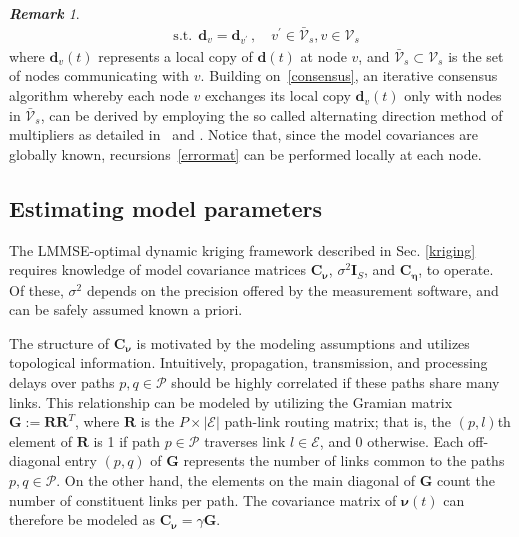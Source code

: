 \documentclass[draftcls,onecolumn,12pt]{IEEEtran}
\providecommand{\abs}[1]{\lvert#1\rvert}												\renewcommand{\b}[1]{\ensuremath{\mathbf{#1}}}		 							\newcommand{\bs}[1]{\ensuremath{\boldsymbol{#1}}}		 						\renewcommand{\c}[1]{\ensuremath{\mathcal{#1}}} 								\newcommand{\E}[1]{\ensuremath{\mathbb{E}\left[#1\right]}} 		  \newcommand{\Es}[1]{\ensuremath{\mathbb{E}^{*}\left[#1\right]}} \newcommand{\ind}{1\hspace{-1.6mm}1}														\newcommand{\norm}[1]{\ensuremath{\left\|#1\right\|}}						\newcommand{\tb}[1]{\ensuremath{\tilde{\mathbf{#1}}}}		 				\newcommand{\mat}[1]{\ensuremath{\begin{bmatrix}#1\end{bmatrix}}}
\def \nut {{\bs{\nu}(t)}}
\def \ceta {{\b{C}_{\bs{\eta}}}}
\def \cnu {{\b{C}_{\bs{\nu}}}}
\def \P {{\c{P}}}
\theoremstyle{plain}\newtheorem{thm}{Theorem}
\theoremstyle{definition}
\theoremstyle{remark}
\newtheorem{rem}{\bf Remark}
\begin{document}
\begin{rem}
{\begin{subequations}
\begin{align}
& \mathrm{s.t. }  ~~ \mathbf{d}_v = \mathbf{d}_{v^\prime} \, , \quad v^\prime \in \bar{\mathcal{V}}_s, v \in \mathcal{V}_s
\end{align}
\end{subequations}
where $\mathbf{d}_v(t)$ represents a local copy of $\mathbf{d}(t)$ at node $v$, and $\bar{\mathcal{V}}_s \subset \mathcal{V}_s$ is the set of nodes communicating with $v$. Building on~\eqref{consensus}, an iterative consensus algorithm whereby each node $v$ exchanges its local copy $\mathbf{d}_v(t)$ only with nodes in $\bar{\mathcal{V}}_s$, can be derived by   
employing the so called alternating direction method of multipliers as detailed in~\cite{SRG08} and \cite{tvt11}. Notice that, since the model covariances are globally known, recursions~\eqref{errormat} can be performed locally at each node.
}
\end{rem}


\subsection{Estimating model parameters} \label{estparam}
The LMMSE-optimal dynamic kriging framework described in Sec. \ref{kriging} requires knowledge of model covariance matrices $\cnu$, $\sigma^2\b{I}_S$, and $\ceta$, to operate. 
Of these, $\sigma^2$ depends on the precision offered by the measurement software, and can be safely assumed known a priori. 

The structure of $\cnu$ is motivated by the modeling assumptions and utilizes topological information. 
Intuitively, propagation, transmission, and processing delays over paths $p, q \in \P$ should be highly correlated if these paths share many links. 
This relationship can be modeled by utilizing the Gramian matrix $\b{G} := \b{R}\b{R}^T$, where $\b{R}$ is the $P \times \abs{\c{E}}$ path-link routing matrix; that is, the $(p,l)$th element of $\b{R}$ is 1 if path $p\in\P$ traverses link $l \in \c{E}$, and 0 otherwise. 
Each off-diagonal entry $(p,q)$ of $\b{G}$ represents the number of links common to the paths $p, q \in \P$.
On the other hand, the elements on the main diagonal of $\b{G}$ count the number of constituent links per path.
The covariance matrix of $\nut$ can therefore be modeled as $\cnu=\gamma\b{G}$. 
\end{document}

